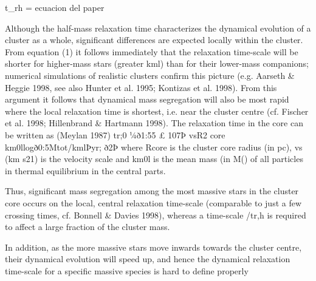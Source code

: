 \documentclass[../main.tex]{subfiles}
\begin{document}
t_rh = ecuacion del paper

Although the half-mass relaxation time characterizes the
dynamical evolution of a cluster as a whole, significant differences
are expected locally within the cluster. From equation (1) it follows
immediately that the relaxation time-scale will be shorter for
higher-mass stars (greater kml) than for their lower-mass
companions; numerical simulations of realistic clusters confirm
this picture (e.g. Aarseth & Heggie 1998, see also Hunter et al.
1995; Kontizas et al. 1998). From this argument it follows that
dynamical mass segregation will also be most rapid where the local
relaxation time is shortest, i.e. near the cluster centre (cf. Fischer
et al. 1998; Hillenbrand & Hartmann 1998). The relaxation time in
the core can be written as (Meylan 1987)
tr;0 ¼ð1:55 £ 107Þ vsR2
core
km0llogð0:5Mtot/kmlÞyr; ð2Þ
where Rcore is the cluster core radius (in pc), vs (km s21) is the
velocity scale and km0l is the mean mass (in M() of all particles in
thermal equilibrium in the central parts.

Thus, significant mass segregation among the most massive stars
in the cluster core occurs on the local, central relaxation time-scale
(comparable to just a few crossing times, cf. Bonnell & Davies
1998), whereas a time-scale /tr,h is required to affect a large
fraction of the cluster mass.

In addition, as the more massive stars move inwards towards the
cluster centre, their dynamical evolution will speed up, and hence the
dynamical relaxation time-scale for a specific massive species is
hard to define properly
\end{document}
